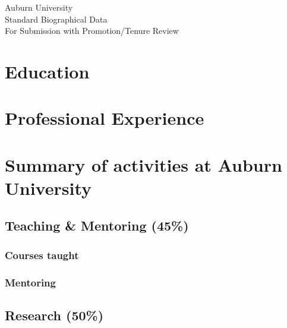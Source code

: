 

\newcommand{\longcontent}[1]{#1}

\newcommand{\oldcontent}[1]{}

\newcommand{\docTitle}{Biographical Data\xspace}


\thispagestyle{empty}
\singlespacing

\begin{mytitle}
    Auburn University \\
    Standard Biographical Data \\
    For Submission with Promotion/Tenure Review
\end{mytitle}



\section{Education}


\section{Professional Experience}


\section{Summary of activities at Auburn University}

\subsection{Teaching \& Mentoring (45\%)}

\subsubsection{Courses taught}


\subsubsection{Mentoring}


\subsection{Research (50\%)}

